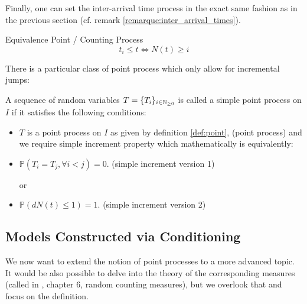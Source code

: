 Finally, one can set the inter-arrival time process in the exact same fashion as in the previous section (cf. remark \ref{remarque:inter_arrival_times}).

\begin{theoreme}[label = thrm:point_counting]{Equivalence Point / Counting Process}
\begin{equation}
t_i \leq t  \iff N(t) \geq i 
\end{equation}
\end{theoreme}


There is a particular class of point process which only allow for incremental jumps:
\begin{definition}
A sequence of random variables $T = \{ T_i \}_{ i \in \mathbb{N}_{\geq 0}}$ is called a simple point process on $I$ if it satisfies the following conditions:
\begin{itemize}
\setlength{\itemindent}{3 cm}
\item $T$ is a point process on $I$ as given by definition \ref{def:point}, (point process)
and we require simple increment property which mathematically is equivalently:
\item $\mathbb P ( T_i = T_j, \forall i < j) = 0$. (simple increment version 1)

or

\item $\mathbb P ( dN(t) \leq 1) = 1$. (simple increment version 2)
\end{itemize}
\end{definition}


\subsection{Models Constructed via Conditioning}
We now want to extend the notion of point processes to a more advanced topic. It would be also possible to delve into the theory of the corresponding measures (called in \cite{daley}, chapter 6, random counting measures), but we overlook that and focus on the definition.


